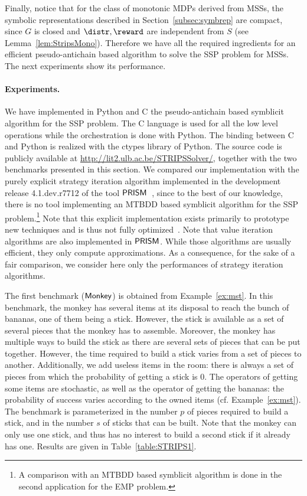 Finally, notice that for the class of monotonic MDPs derived from MSSs, the symbolic representations described in Section~\ref{subsec:symbrep} are compact, since $G$ is closed and  $\distr, \reward$ are independent from $S$ (see Lemma~\ref{lem:StripsMono}).
Therefore we have all the required ingredients for an efficient pseudo-antichain based algorithm to solve the SSP problem for MSSs. The next experiments show its performance.

\paragraph{Experiments.} We have implemented  in Python and C the pseudo-antichain based symblicit algorithm for the SSP problem. The C language is used for all the low level operations while the orchestration is done with Python. The binding between C and Python is realized with the ctypes library of Python. The source code is publicly available at \url{http://lit2.ulb.ac.be/STRIPSSolver/}, together with the two benchmarks presented in this section. We compared our implementation with the purely explicit strategy iteration algorithm implemented in the development release 4.1.dev.r7712 of the tool $\sf{PRISM}$~\cite{KNP11}, since to the best of our knowledge, there is no tool implementing an MTBDD based symblicit algorithm for the SSP problem.\footnote{A comparison with an MTBDD based symblicit algorithm is done in the second application for the EMP problem.} Note that this explicit implementation exists primarily to prototype new techniques and is thus not fully optimized~\cite{Parker}. Note that value iteration algorithms are also implemented in $\sf{PRISM}$. 
While those algorithms are usually efficient, they only compute approximations. As a consequence, for the sake of a fair comparison, we consider here only the performances of strategy iteration algorithms. 

\medskip
The first benchmark ($\sf{Monkey}$) is obtained from Example~\ref{ex:mst}. In this benchmark, the monkey has several items at its disposal to reach the bunch of bananas, one of them being a stick. However, the stick is available as a set of several pieces that the monkey has to assemble. Moreover, the monkey has multiple ways to build the stick as there are several sets of pieces that can be put together. However, the time required to build a stick varies from a set of pieces to another. Additionally, we add useless items in the room: there is always a set of pieces from which the probability of getting a stick is $0$. The operators of getting some items are stochastic, as well as the operator of getting the bananas: the probability of success varies according to the owned items (cf. Example~\ref{ex:mst}). The benchmark is parameterized in the number $p$ of pieces required to build a stick, and in the number $s$ of sticks that can be built. Note that the monkey can only use one stick, and thus has no interest to build a second stick if it already has one. Results are given in Table~\ref{table:STRIPS1}. 

